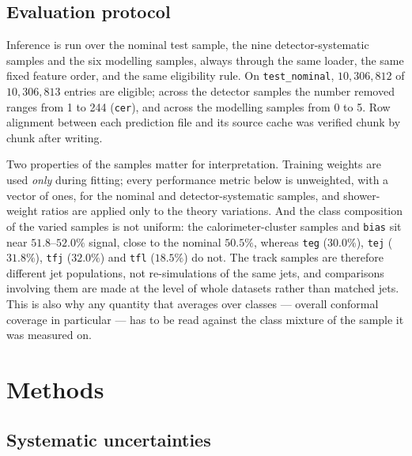 \documentclass[pdflatex,sn-mathphys,Numbered,iicol]{sn-jnl}
\begin{document}
\subsection{Evaluation protocol}
\label{sec:evalprotocol}

Inference is run over the nominal test sample, the nine detector-systematic samples and
the six modelling samples, always through the same loader, the same fixed feature
order, and the same eligibility rule. On \texttt{test\_nominal}, $10{,}306{,}812$ of
$10{,}306{,}813$ entries are eligible; across the detector samples the number removed
ranges from 1 to 244 (\texttt{cer}), and across the modelling samples from 0 to 5. Row
alignment between each prediction file and its source cache was verified chunk by chunk
after writing.

Two properties of the samples matter for interpretation. Training weights are used
\emph{only} during fitting; every performance metric below is unweighted, with a vector
of ones, for the nominal and detector-systematic samples, and shower-weight ratios are
applied only to the theory variations. And the class composition of the varied samples
is not uniform: the calorimeter-cluster samples and \texttt{bias} sit near
$51.8$--$52.0\%$ signal, close to the nominal $50.5\%$, whereas \texttt{teg}
($30.0\%$), \texttt{tej} ($31.8\%$), \texttt{tfj} ($32.0\%$) and \texttt{tfl}
($18.5\%$) do not. The track samples are therefore different jet populations, not
re-simulations of the same jets, and comparisons involving them are made at the level
of whole datasets rather than matched jets. This is also why any quantity that averages
over classes --- overall conformal coverage in particular --- has to be read against
the class mixture of the sample it was measured on.

\section{Methods}
\label{sec:methods}

\subsection{Systematic uncertainties}
\label{sec:syst}
\end{document}
